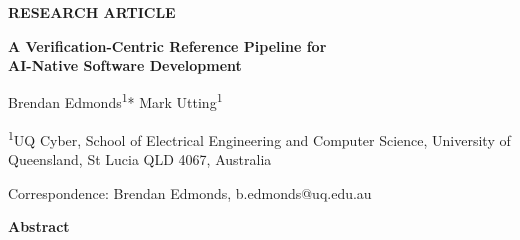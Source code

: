 \documentclass[11pt]{article}
\begin{document}
\linenumbers

\noindent\textbf{RESEARCH ARTICLE}
\vspace{1em}

\begin{center}
{\LARGE\bfseries A Verification-Centric Reference Pipeline for\\AI-Native Software Development}
\vspace{1.5em}

{\large Brendan Edmonds\textsuperscript{1}* \quad Mark Utting\textsuperscript{1}}
\vspace{0.5em}

{\small\textsuperscript{1}UQ Cyber, School of Electrical Engineering and Computer Science, University of Queensland, St Lucia QLD 4067, Australia}
\vspace{0.5em}

{\small *Correspondence: Brendan Edmonds, b.edmonds@uq.edu.au}
\end{center}

\vspace{1em}

\noindent\textbf{Abstract}
\vspace{0.5em}
\end{document}
